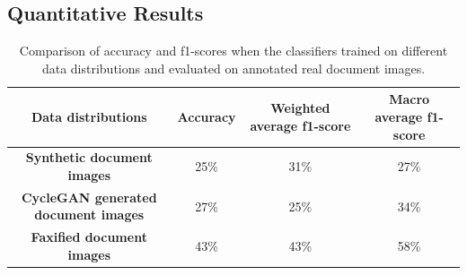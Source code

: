 \subsection{Quantitative Results}



\begin{table}[hbp!]
\hspace*{-4.5em}
\begin{tabular}{cccc} 
	\toprule
	\bf{Data distributions} & \bf{Accuracy}  & \bf{Weighted average f1-score} & \bf{Macro average f1-score} \\[0.0ex] 
	\midrule
     \bf{Synthetic document images} & 25\% & 31\% & 27\%\\[0.0ex]
     \midrule
     \bf{\ac{CycleGAN} generated document images} & 27\% & 25\% & 34\%\\[0.0ex]
     \midrule
     \bf{Faxified document images} & 43\% & 43\% & 58\%\\[0.0ex]
     \bottomrule
\end{tabular}
 \caption[Comparison of accuracy and f1-scores when the classifiers trained on different data distributions and evaluated on annotated real document images.]{Comparison of accuracy and f1-scores when the classifiers trained on different data distributions and evaluated on annotated real document images.}
    \label{table:finalResults}
\end{table}


